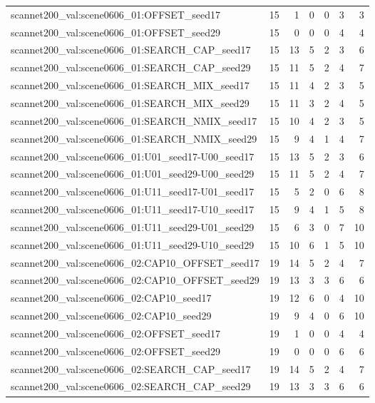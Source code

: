 \begin{table}[t]
\begin{tabular}{lrrrrrr}
scannet200\_val:scene0606\_01:OFFSET\_seed17 & 15 & 1 & 0 & 0 & 3 & 3 \\
scannet200\_val:scene0606\_01:OFFSET\_seed29 & 15 & 0 & 0 & 0 & 4 & 4 \\
scannet200\_val:scene0606\_01:SEARCH\_CAP\_seed17 & 15 & 13 & 5 & 2 & 3 & 6 \\
scannet200\_val:scene0606\_01:SEARCH\_CAP\_seed29 & 15 & 11 & 5 & 2 & 4 & 7 \\
scannet200\_val:scene0606\_01:SEARCH\_MIX\_seed17 & 15 & 11 & 4 & 2 & 3 & 5 \\
scannet200\_val:scene0606\_01:SEARCH\_MIX\_seed29 & 15 & 11 & 3 & 2 & 4 & 5 \\
scannet200\_val:scene0606\_01:SEARCH\_NMIX\_seed17 & 15 & 10 & 4 & 2 & 3 & 5 \\
scannet200\_val:scene0606\_01:SEARCH\_NMIX\_seed29 & 15 & 9 & 4 & 1 & 4 & 7 \\
scannet200\_val:scene0606\_01:U01\_seed17-U00\_seed17 & 15 & 13 & 5 & 2 & 3 & 6 \\
scannet200\_val:scene0606\_01:U01\_seed29-U00\_seed29 & 15 & 11 & 5 & 2 & 4 & 7 \\
scannet200\_val:scene0606\_01:U11\_seed17-U01\_seed17 & 15 & 5 & 2 & 0 & 6 & 8 \\
scannet200\_val:scene0606\_01:U11\_seed17-U10\_seed17 & 15 & 9 & 4 & 1 & 5 & 8 \\
scannet200\_val:scene0606\_01:U11\_seed29-U01\_seed29 & 15 & 6 & 3 & 0 & 7 & 10 \\
scannet200\_val:scene0606\_01:U11\_seed29-U10\_seed29 & 15 & 10 & 6 & 1 & 5 & 10 \\
scannet200\_val:scene0606\_02:CAP10\_OFFSET\_seed17 & 19 & 14 & 5 & 2 & 4 & 7 \\
scannet200\_val:scene0606\_02:CAP10\_OFFSET\_seed29 & 19 & 13 & 3 & 3 & 6 & 6 \\
scannet200\_val:scene0606\_02:CAP10\_seed17 & 19 & 12 & 6 & 0 & 4 & 10 \\
scannet200\_val:scene0606\_02:CAP10\_seed29 & 19 & 9 & 4 & 0 & 6 & 10 \\
scannet200\_val:scene0606\_02:OFFSET\_seed17 & 19 & 1 & 0 & 0 & 4 & 4 \\
scannet200\_val:scene0606\_02:OFFSET\_seed29 & 19 & 0 & 0 & 0 & 6 & 6 \\
scannet200\_val:scene0606\_02:SEARCH\_CAP\_seed17 & 19 & 14 & 5 & 2 & 4 & 7 \\
scannet200\_val:scene0606\_02:SEARCH\_CAP\_seed29 & 19 & 13 & 3 & 3 & 6 & 6 \\

\end{tabular}
\end{table}

